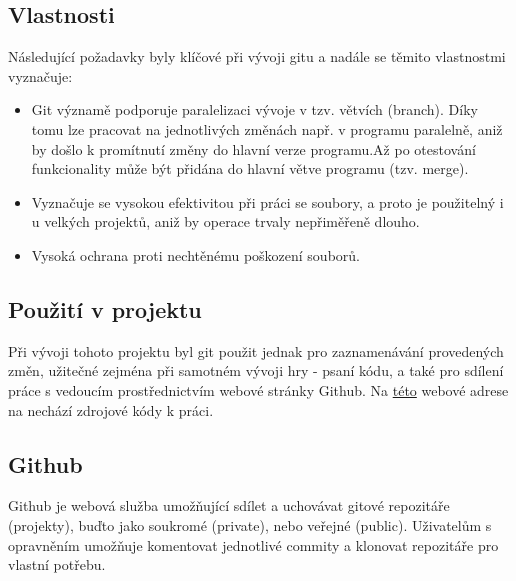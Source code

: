 \documentclass[main.tex]{subfiles}
\begin{document}


\subsection{Vlastnosti}
Následující požadavky byly klíčové při vývoji gitu a nadále se těmito vlastnostmi vyznačuje:
\begin{itemize}
\item Git významě podporuje paralelizaci vývoje v tzv. větvích (branch). Díky tomu lze pracovat na jednotlivých změnách např. v programu paralelně, aniž by došlo k promítnutí změny do hlavní verze programu.Až po otestování funkcionality může být přidána do hlavní větve programu (tzv. merge). 

\item Vyznačuje se vysokou efektivitou při práci se soubory, a proto je použitelný i u velkých projektů, aniž by operace trvaly nepřiměřeně dlouho.

\item Vysoká ochrana proti nechtěnému poškození souborů.

\end{itemize}





\subsection{Použití v projektu}
Při vývoji tohoto projektu byl git použit jednak pro zaznamenávání provedených změn, užitečné zejména při samotném vývoji hry - psaní kódu, a také pro sdílení práce s vedoucím prostřednictvím webové stránky Github. Na \href{https://github.com/vojta006/mp}{této} webové adrese na nechází zdrojové kódy k práci.

\subsection{Github}
Github je webová služba umožňující sdílet a uchovávat gitové repozitáře (projekty), buďto jako soukromé (private), nebo veřejné (public). Uživatelům s opravněním umožňuje komentovat jednotlivé commity a klonovat repozitáře pro vlastní potřebu. 
\end{document}
